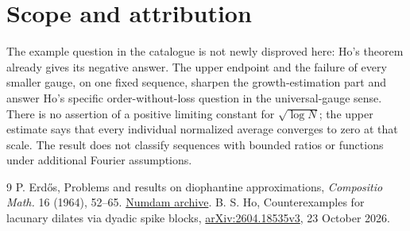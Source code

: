 \documentclass[11pt]{article}
\begin{document}
\section{Scope and attribution}
The example question in the catalogue is not newly disproved here: Ho's theorem already gives its negative answer. The upper endpoint and the failure of every smaller gauge, on one fixed sequence, sharpen the growth-estimation part and answer Ho's specific order-without-loss question in the universal-gauge sense. There is no assertion of a positive limiting constant for $\sqrt{\log N}$; the upper estimate says that every individual normalized average converges to zero at that scale. The result does not classify sequences with bounded ratios or functions under additional Fourier assumptions.

\begin{thebibliography}{9}
 P. Erd\H{o}s, Problems and results on diophantine approximations, \emph{Compositio Math.} 16 (1964), 52--65. \href{https://www.numdam.org/item/CM_1964__16__52_0/}{Numdam archive}.
 B. S. Ho, Counterexamples for lacunary dilates via dyadic spike blocks, \href{https://arxiv.org/abs/2604.18535v3}{arXiv:2604.18535v3}, 23 October 2026.
\end{thebibliography}
\end{document}
